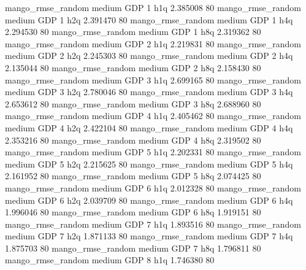 mango_rmse_random     medium      GDP                 1                  h1q  2.385008 80
mango_rmse_random     medium      GDP                 1                  h2q  2.391470 80
mango_rmse_random     medium      GDP                 1                  h4q  2.294530 80
mango_rmse_random     medium      GDP                 1                  h8q  2.319362 80
mango_rmse_random     medium      GDP                 2                  h1q  2.219831 80
mango_rmse_random     medium      GDP                 2                  h2q  2.245303 80
mango_rmse_random     medium      GDP                 2                  h4q  2.135044 80
mango_rmse_random     medium      GDP                 2                  h8q  2.158430 80
mango_rmse_random     medium      GDP                 3                  h1q  2.699165 80
mango_rmse_random     medium      GDP                 3                  h2q  2.780046 80
mango_rmse_random     medium      GDP                 3                  h4q  2.653612 80
mango_rmse_random     medium      GDP                 3                  h8q  2.688960 80
mango_rmse_random     medium      GDP                 4                  h1q  2.405462 80
mango_rmse_random     medium      GDP                 4                  h2q  2.422104 80
mango_rmse_random     medium      GDP                 4                  h4q  2.353216 80
mango_rmse_random     medium      GDP                 4                  h8q  2.319502 80
mango_rmse_random     medium      GDP                 5                  h1q  2.202331 80
mango_rmse_random     medium      GDP                 5                  h2q  2.215625 80
mango_rmse_random     medium      GDP                 5                  h4q  2.161952 80
mango_rmse_random     medium      GDP                 5                  h8q  2.074425 80
mango_rmse_random     medium      GDP                 6                  h1q  2.012328 80
mango_rmse_random     medium      GDP                 6                  h2q  2.039709 80
mango_rmse_random     medium      GDP                 6                  h4q  1.996046 80
mango_rmse_random     medium      GDP                 6                  h8q  1.919151 80
mango_rmse_random     medium      GDP                 7                  h1q  1.893516 80
mango_rmse_random     medium      GDP                 7                  h2q  1.871133 80
mango_rmse_random     medium      GDP                 7                  h4q  1.875703 80
mango_rmse_random     medium      GDP                 7                  h8q  1.796811 80
mango_rmse_random     medium      GDP                 8                  h1q  1.746380 80
